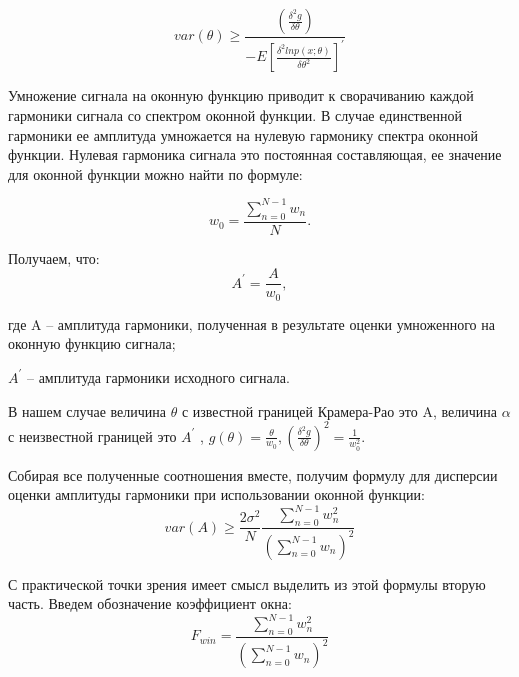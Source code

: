 \begin{equation}
	\label{eq:equation8}
	var(\theta)\geq \frac{\left(\frac{\delta^2 g}{\delta\theta}\right)}{-E\left[\frac{\delta^2 ln p(x;\theta)}{\delta \theta^2}\right]^{'}}
\end{equation}

Умножение сигнала на оконную функцию приводит к сворачиванию каждой гармоники сигнала со спектром оконной функции. В случае единственной гармоники ее амплитуда умножается на нулевую гармонику спектра оконной функции. Нулевая гармоника сигнала это постоянная составляющая, ее значение для оконной функции можно найти по формуле: 

\begin{equation}
	\label{eq:equation9}
	w_0= \frac{\sum_{n=0}^{N-1} w_n}{N}.	  
\end{equation}

Получаем, что: 
\begin{equation}
	\label{eq:equation10}
	A^{'}=\frac{A}{w_0} ,		  
\end{equation}

где A -- амплитуда гармоники, полученная в результате оценки умноженного на оконную функцию сигнала; 

$A^{'}$ -- амплитуда гармоники исходного сигнала.

В нашем случае величина $\theta$ с известной границей Крамера-Рао это A, величина $\alpha$ с неизвестной границей это  $A^{'}$ , $g(\theta)=\frac{\theta}{w_0}, \left(\frac{\delta^2 g}{\delta \theta}\right)^2=\frac{1}{w_0^2}$.

Собирая все полученные соотношения вместе, получим формулу для дисперсии оценки амплитуды гармоники при использовании оконной функции: 
\begin{equation}
	\label{eq:equation11}
	var(A)\geq \frac{2\sigma^2}{N} \frac{\sum_{n=0}^{N-1}w_n^2}{\left(\sum_{n=0}^{N-1} w_n \right)^2} 			  
\end{equation}


С практической точки зрения имеет смысл выделить из этой формулы вторую часть. Введем обозначение коэффициент окна: 
\begin{equation}
	\label{eq:equation12}
	F_{win}=\frac{\sum_{n=0}^{N-1}w_n^2}{\left(\sum_{n=0}^{N-1} w_n\right)^2}
\end{equation}

